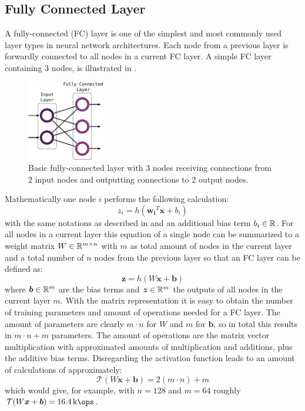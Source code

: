 
\subsection{Fully Connected Layer}
A fully-connected (FC) layer is one of the simplest and most commonly used layer types in neural network architectures.
Each node from a previous layer is forwardly connected to all nodes in a current FC layer.
A simple FC layer containing 3 nodes, is illustrated in .
\begin{figure}[!ht]
  \centering
    \includegraphics[width=0.30\textwidth]{./4_nn/figs/nn_theory_fc.pdf}
  \caption{Basic fully-connected layer with 3 nodes receiving connections from 2 input nodes and outputting connections to 2 output nodes.}
  \label{fig:nn_theory_fc}
\end{figure}
\FloatBarrier
\noindent
Mathematically one node $i$ performs the following calculation:
\begin{equation}
  z_i = h(\bm{w_i}^T \bm{x} + b_i)
\end{equation}
with the same notations as described in  and an additional bias term $b_i \in \mathbb{R}$.
For all nodes in a current layer this equation of a single node can be summarized to a weight matrix $W \in \mathbb{R}^{m \times n}$ with $m$ as total amount of nodes in the current layer and a total number of $n$ nodes from the previous layer so that an FC layer can be defined as:
\begin{equation}
  \bm{z} = h(W \bm{x} + \bm{b})
\end{equation}
where $\bm{b} \in \mathbb{R}^m$ are the bias terms and $\bm{z} \in \mathbb{R}^m$ the outputs of all nodes in the current layer $m$.
With the matrix representation it is easy to obtain the number of training parameters and amount of operations needed for a FC layer.
The amount of parameters are clearly $m \cdot n$ for $W$ and $m$ for $\bm{b}$, so in total this results in $m \cdot n + m$ parameters.
The amount of operations are the matrix vector multiplication with approximated amounts of multiplication and additions, plus the additive bias terms.
Disregarding the activation function leads to an amount of calculations of approximately:
\begin{equation} 
  \mathcal{T}(W \bm{x} + \bm{b}) = 2 (m \cdot n) + m
\end{equation}
which would give, for example, with $n = 128$ and $m = 64$ roughly $\mathcal{T}(W \bm{x} + \bm{b}) = \SI{16.4}{\kilo\ops}$.


